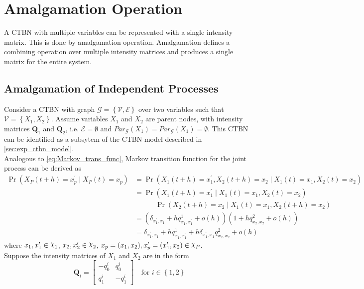 %
\appendix

\chapter{Amalgamation Operation}
\label{ap:amalgamation}
A CTBN with multiple variables can be represented with a single intensity matrix. This is done by amalgamation operation. Amalgamation defines a combining operation over multiple intensity matrices and produces a single matrix for the entire system. 

\section{Amalgamation of Independent Processes}
Consider a CTBN with graph $ \mathcal{G} = \left\lbrace \mathcal{V}, \mathcal{E} \right\rbrace $ over two variables such that $ \mathcal{V} = \left\lbrace X_1, X_2\right\rbrace $. Assume variables $ X_1 $ and $ X_2 $ are parent nodes, with intensity matrices $ \textbf{Q}_1 $ and $ \textbf{Q}_2 $, i.e. $ \mathcal{E} = \emptyset $ and $ Par_{\mathcal{G}}(X_1) = Par_{\mathcal{G}}(X_1) = \emptyset $. This CTBN can be identified as a subsytem of the CTBN model described in \cref{sec:exp_ctbn_model}. \\
Analogous to \autoref{eq:Markov_trans_func}, Markov transition function for the joint process can be derived as
\begin{align}
	\operatorname{Pr}(X_P(t+h) = x_p^\prime\mid X_P(t) = x_p)
	&=  \operatorname{Pr}(X_1(t+h) = x_1^\prime, X_2(t+h) = x_2 \mid X_1(t) = x_1, X_2(t) = x_2)\nonumber \\
	&= \operatorname{Pr}(X_1(t+h) = x_1^\prime \mid X_1(t) = x_1, X_2(t) = x_2) \nonumber\\
	& \quad \quad \quad \operatorname{Pr}( X_2(t+h) = x_2 \mid X_1(t) = x_1, X_2(t+h) = x_2) \nonumber\\
	& = (\delta_{x_1^\prime, x_1} + hq^1_{x_1, x_1^\prime} + o(h))(1 + hq^2_{x_2, x_2} + o(h))\nonumber\\
	& = \delta_{x_1^\prime, x_1} + hq^1_{x_1, x_1^\prime} + h\delta_{x_1^\prime, x_1}q^2_{x_2, x_2} + o(h)
	\label{eq:amalg}
\end{align}
where $ x_1, x_1^\prime \in \rchi_1 $, $ x_2, x_2^\prime \in \rchi_2 $, $ x_p = (x_1, x_2), x_p^\prime = (x_1^\prime, x_2) \in \rchi_P $.\\
Suppose the intensity matrices of $ X_1 $ and $ X_2 $ are in the form
\begin{equation}
\textbf{Q}_i = 
\begin{bmatrix}
-q^{i}_{0} & q^{i}_{0} \\
q^{i}_{1} & -q^{i}_{1}
\end{bmatrix} \quad \text{for } i \in \left\lbrace 1,2\right\rbrace 
\end{equation}
